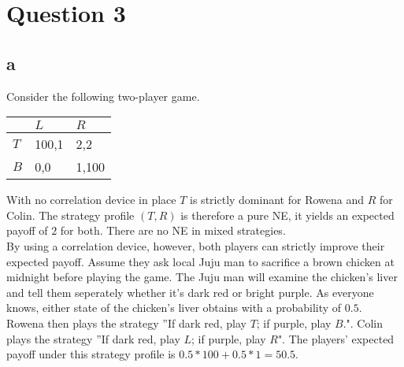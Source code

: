 \documentclass[10pt,a4paper]{article}
\begin{document}
\section*{Question 3}
\subsection*{a}
Consider the following two-player game.
\begin{table}[h]
\begin{tabular}{|l|l|l|}
\hline
          & $L$ & $R$  \\ \hline
$T$     & 100,1   & 2,2 \\ \hline
$B$     & 0,0 & 1,100  \\ \hline
\end{tabular}
\end{table}
With no correlation device in place $T$ is strictly dominant for Rowena and $R$ for Colin. The strategy profile $(T,R)$ is therefore a pure NE, it yields an expected payoff of $2$ for both. There are no NE in mixed strategies.\\
By using a correlation device, however, both players can strictly improve their expected payoff. Assume they ask local Juju man to sacrifice a brown chicken at midnight before playing the game. The Juju man will examine the chicken's liver and tell them seperately whether it's dark red or bright purple. As everyone knows, either state of the chicken's liver obtains with a probability of $0.5$.\\ Rowena then plays the strategy ''If dark red, play $T$; if purple, play $B$.". Colin plays the strategy ''If dark red, play $L$; if purple, play $R$". The players' expected payoff under this strategy profile is $0.5*100+0.5*1=50.5$. 
\end{document}
